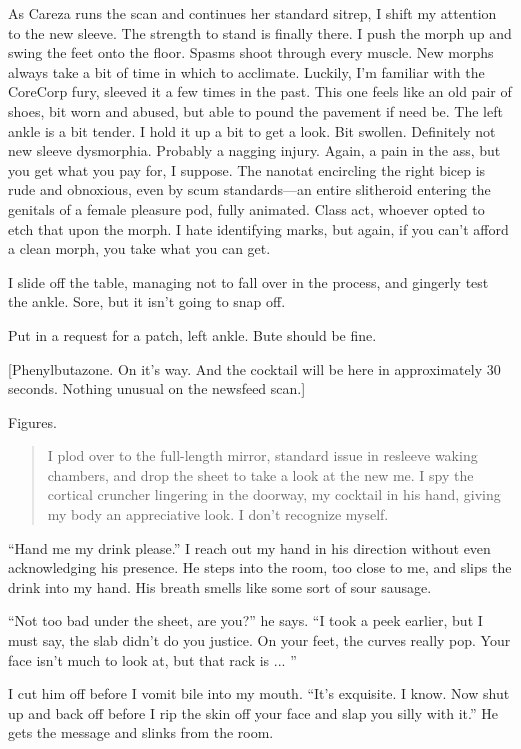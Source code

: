 As Careza runs the scan and continues her standard sitrep, I shift my
attention to the new sleeve. The strength to stand is finally there. I
push the morph up and swing the feet onto the floor. Spasms shoot
through every muscle. New morphs always take a bit of time in which to
acclimate.  Luckily, I'm familiar with the CoreCorp fury, sleeved it a
few times in the past. This one feels like an old pair of shoes, bit
worn and abused, but able to pound the pavement if need be. The left
ankle is a bit tender. I hold it up a bit to get a look. Bit
swollen. Definitely not new sleeve dysmorphia. Probably a nagging
injury. Again, a pain in the ass, but you get what you pay for, I
suppose.  The nanotat encircling the right bicep is rude and
obnoxious, even by scum standards—an entire slitheroid entering the
genitals of a female pleasure pod, fully animated. Class act, whoever
opted to etch that upon the morph. I hate identifying marks, but
again, if you can't afford a clean morph, you take what you can get.

I slide off the table, managing not to fall over in the process, and
gingerly test the ankle. Sore, but it isn't going to snap off.

Put in a request for a patch, left ankle. Bute should be fine.

[Phenylbutazone. On it's way. And the cocktail will be here in
approximately 30 seconds. Nothing unusual on the newsfeed scan.]

Figures.

\begin{quotation}
  I plod over to the full-length mirror, standard issue in resleeve
  waking chambers, and drop the sheet to take a look at the new me. I
  spy the cortical cruncher lingering in the doorway, my cocktail in
  his hand, giving my body an appreciative look. I don't recognize
  myself.
\end{quotation}

``Hand me my drink please.'' I reach out my hand in his direction
without even acknowledging his presence.  He steps into the room, too
close to me, and slips the drink into my hand. His breath smells like
some sort of sour sausage.

``Not too bad under the sheet, are you?'' he says. ``I took a peek
earlier, but I must say, the slab didn't do you justice. On your feet,
the curves really pop. Your face isn't much to look at, but that rack
is ... ''

I cut him off before I vomit bile into my mouth. ``It's exquisite. I
know. Now shut up and back off before I rip the skin off your face and
slap you silly with it.''  He gets the message and slinks from the
room.

